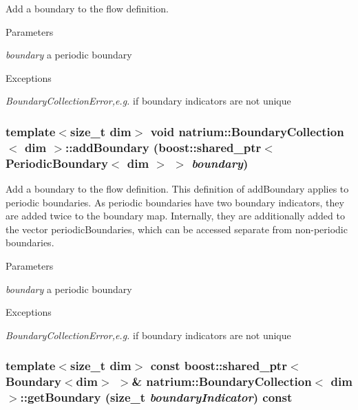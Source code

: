 Add a boundary to the flow definition. 
\begin{DoxyParams}{Parameters}
\item[{\em boundary}]a periodic boundary \end{DoxyParams}

\begin{DoxyExceptions}{Exceptions}
\item[{\em BoundaryCollectionError,e.g.}]if boundary indicators are not unique \end{DoxyExceptions}
\hypertarget{classnatrium_1_1BoundaryCollection_a9f957b5338bca01c7bd8c21576ec922c}{
\subsubsection[{addBoundary}]{\setlength{\rightskip}{0pt plus 5cm}template$<$size\_\-t dim$>$ void {\bf natrium::BoundaryCollection}$<$ dim $>$::addBoundary (boost::shared\_\-ptr$<$ {\bf PeriodicBoundary}$<$ dim $>$ $>$ {\em boundary})}}
\label{classnatrium_1_1BoundaryCollection_a9f957b5338bca01c7bd8c21576ec922c}


Add a boundary to the flow definition. This definition of addBoundary applies to periodic boundaries. As periodic boundaries have two boundary indicators, they are added twice to the boundary map. Internally, they are additionally added to the vector periodicBoundaries, which can be accessed separate from non-\/periodic boundaries. 
\begin{DoxyParams}{Parameters}
\item[{\em boundary}]a periodic boundary \end{DoxyParams}

\begin{DoxyExceptions}{Exceptions}
\item[{\em BoundaryCollectionError,e.g.}]if boundary indicators are not unique \end{DoxyExceptions}
\hypertarget{classnatrium_1_1BoundaryCollection_a44816fa48b8100fb37b8ad7491c2cc6c}{
\subsubsection[{getBoundary}]{\setlength{\rightskip}{0pt plus 5cm}template$<$size\_\-t dim$>$ const boost::shared\_\-ptr$<${\bf Boundary}$<$dim$>$ $>$\& {\bf natrium::BoundaryCollection}$<$ dim $>$::getBoundary (size\_\-t {\em boundaryIndicator}) const}}
\label{classnatrium_1_1BoundaryCollection_a44816fa48b8100fb37b8ad7491c2cc6c}


